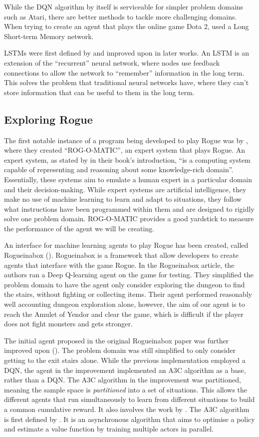 \documentclass[11pt,a4paper]{article}
\begin{document}
While the DQN algorithm by itself is serviceable for simpler problem domains such as Atari, there are better methods to tackle more challenging domains. When trying to create an agent that plays the online game Dota 2, \cite{berner19} used a Long Short-term Memory network.

LSTMs were first defined by \cite{hochreiter97} and improved upon in later works. An LSTM is an extension of the ``recurrent'' neural network, where nodes use feedback connections to allow the network to ``remember'' information in the long term. This solves the problem that traditional neural networks have, where they can't store information that can be useful to them in the long term.

\subsection{Exploring Rogue}
The first notable instance of a program being developed to play Rogue was by \cite{mauldin83}, where they created ``ROG-O-MATIC'', an expert system that plays Rogue. An expert system, as stated by \cite{jackson86} in their book's introduction, ``is a computing system capable of representing and reasoning about some knowledge-rich domain''. Essentially, these systems aim to emulate a human expert in a particular domain and their decision-making. While expert systems are artificial intelligence, they make no use of machine learning to learn and adapt to situations, they follow what instructions have been programmed within them and are designed to rigidly solve one problem domain. ROG-O-MATIC provides a good yardstick to measure the performance of the agent we will be creating.

An interface for machine learning agents to play Rogue has been created, called Rogueinabox (\cite{asperti17}). Rogueinabox is a framework that allow developers to create agents that interface with the game Rogue. In the Rogueinabox article, the authors ran a Deep Q-learning agent on the game for testing. They simplified the problem domain to have the agent only consider exploring the dungeon to find the stairs, without fighting or collecting items. Their agent performed reasonably well accounting dungeon exploration alone, however, the aim of our agent is to reach the Amulet of Yendor and clear the game, which is difficult if the player does not fight monsters and gets stronger.

The initial agent proposed in the original Rogueinabox paper was further improved upon (\cite{asperti18}). The problem domain was still simplified to only consider getting to the exit stairs alone. While the previous implementation employed a DQN, the agent in the improvement implemented an A3C algorithm as a base, rather than a DQN. The A3C algorithm in the improvement was partitioned, meaning the sample space is \emph{partitioned} into a set of situations. This allows the different agents that run simultaneously to learn from different situations to build a common cumulative reward. It also involves the work by \cite{jaderberg16}. The A3C algorithm is first defined by \cite{mnih15}. It is an asynchronous algorithm that aims to optimise a policy and estimate a value function by training multiple actors in parallel.
\end{document}
